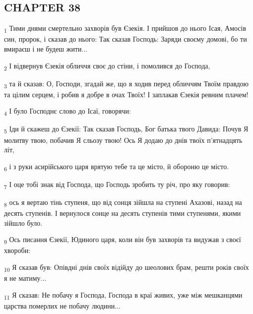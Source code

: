 \subsection{CHAPTER 38}
\begin{tcolorbox}
\textsubscript{1} Тими днями смертельно захворів був Єзекія. І прийшов до нього Ісая, Амосів син, пророк, і сказав до нього: Так сказав Господь: Заряди своєму домові, бо ти вмираєш і не будеш жити...
\end{tcolorbox}
\begin{tcolorbox}
\textsubscript{2} І відвернув Єзекія обличчя своє до стіни, і помолився до Господа,
\end{tcolorbox}
\begin{tcolorbox}
\textsubscript{3} та й сказав: О, Господи, згадай же, що я ходив перед обличчям Твоїм правдою та цілим серцем, і робив я добре в очах Твоїх! І заплакав Єзекія ревним плачем!
\end{tcolorbox}
\begin{tcolorbox}
\textsubscript{4} І було Господнє слово до Ісаї, говорячи:
\end{tcolorbox}
\begin{tcolorbox}
\textsubscript{5} Іди й скажеш до Єзекії: Так сказав Господь, Бог батька твого Давида: Почув Я молитву твою, побачив Я сльозу твою! Ось Я додаю до днів твоїх п'ятнадцять літ,
\end{tcolorbox}
\begin{tcolorbox}
\textsubscript{6} і з руки асирійського царя врятую тебе та це місто, й обороню це місто.
\end{tcolorbox}
\begin{tcolorbox}
\textsubscript{7} І оце тобі знак від Господа, що Господь зробить ту річ, про яку говорив:
\end{tcolorbox}
\begin{tcolorbox}
\textsubscript{8} ось я вертаю тінь ступеня, що від сонця зійшла на ступені Ахазові, назад на десять ступенів. І вернулося сонце на десять ступенів тими ступенями, якими зійшло було.
\end{tcolorbox}
\begin{tcolorbox}
\textsubscript{9} Ось писання Єзекії, Юдиного царя, коли він був захворів та видужав з своєї хвороби:
\end{tcolorbox}
\begin{tcolorbox}
\textsubscript{10} Я сказав був: Опівдні днів своїх відійду до шеолових брам, решти років своїх я не матиму...
\end{tcolorbox}
\begin{tcolorbox}
\textsubscript{11} Я сказав: Не побачу я Господа, Господа в краї живих, уже між мешканцями царства померлих не побачу людини...
\end{tcolorbox}
